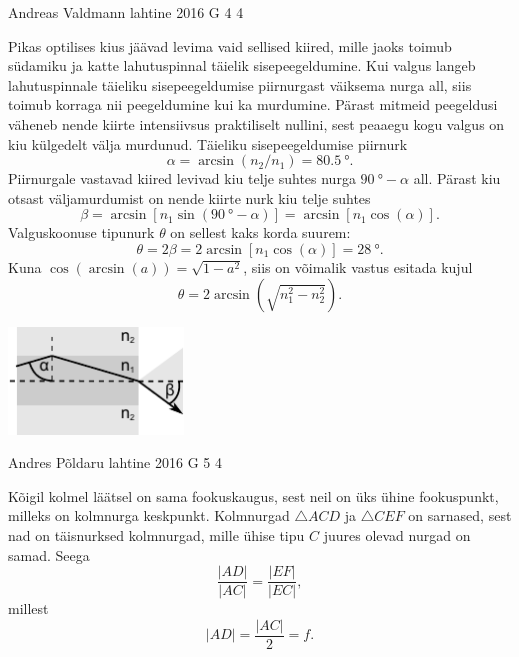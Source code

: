\documentclass[11pt]{article}
\begin{document}
{%
{Andreas Valdmann} %
{lahtine} %
{2016} %
{G 4} %
{4} %
{

\ifSolution
Pikas optilises kius jäävad levima vaid sellised kiired, mille jaoks toimub südamiku ja katte lahutuspinnal täielik sisepeegeldumine. Kui valgus langeb lahutuspinnale täieliku sisepeegeldumise piirnurgast väiksema nurga all, siis toimub korraga nii peegeldumine kui ka murdumine. Pärast mitmeid peegeldusi väheneb nende kiirte intensiivsus praktiliselt nullini, sest peaaegu kogu valgus on kiu külgedelt välja murdunud. Täieliku sisepeegeldumise piirnurk 
\[
\alpha=\arcsin(n_2/n_1)=\SI{80,5}{\degree}.
\]
Piirnurgale vastavad kiired levivad kiu telje suhtes nurga $\SI{90}{\degree}-\alpha$ all. Pärast kiu otsast väljamurdumist on nende kiirte nurk kiu telje suhtes 
\[
\beta=\arcsin[n_1\sin(\SI{90}{\degree}-\alpha)]=\arcsin[n_1\cos(\alpha)].
\]
Valguskoonuse tipunurk $\theta$ on sellest kaks korda suurem: 
\[
\theta=2\beta=2\arcsin[n_1\cos(\alpha)]=\SI{28}{\degree}.
\]
Kuna $\cos(\arcsin(a))=\sqrt{1-a^2}$, siis on võimalik vastus esitada kujul 
\[
\theta=2\arcsin(\sqrt{n_1^2-n_2^2}).
\]

\begin{center}
 \includegraphics[width=0.35\textwidth]{2016-lahg-04-kiud}
\end{center}
\fi
}

{Andres Põldaru} %
{lahtine} %
{2016} %
{G 5} %
{4} %
{

\ifSolution
Kõigil kolmel läätsel on sama fookuskaugus, sest neil on üks ühine fookuspunkt, milleks on kolmnurga keskpunkt. Kolmnurgad $\triangle ACD$ ja $\triangle CEF$ on sarnased, sest nad on täisnurksed kolmnurgad, mille ühise tipu $C$ juures olevad nurgad on samad. Seega 
\[
\frac{|AD|}{|AC|}=\frac{|EF|}{|EC|},
\]
millest
\[
|AD| = \frac{|AC|}{2} = f.
\]

}}
\end{document}
